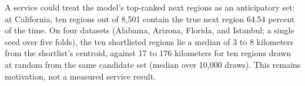 A service could treat the model's top-ranked next regions as an anticipatory
set: at California, ten regions out of 8{,}501 contain the true next region 64.54
percent of the time. On four datasets (Alabama, Arizona, Florida, and Istanbul; a single seed over five folds), the ten shortlisted
regions lie a median of 3 to 8 kilometers from the shortlist's centroid, against 17 to 176 kilometers for ten regions
drawn at random from the same candidate set (median over 10,000 draws). This remains motivation, not a measured service
result.

